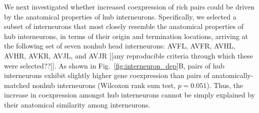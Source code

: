 \documentclass[10pt,letterpaper]{article}
\begin{document}
{We next investigated whether increased coexpression of rich pairs could be driven by the anatomical properties of hub interneurons.
Specifically, we selected a subset of interneurons that most closely resemble the anatomical properties of hub interneurons, in terms of their origin and termination locations, arriving at the following set of seven nonhub head interneurons: AVFL, AVFR, AVHL, AVHR, AVKR, AVJL, and AVJR [[any reproducible criteria through which these were selected??]].
As shown in Fig.~\ref{fig:interneuron_dep}B, pairs of hub interneurons exhibit slightly higher gene coexpression than pairs of anatomically-matched nonhub interneurons (Wilcoxon rank sum test, $p = 0.051$).
Thus, the increase in coexpression amongst hub interneurons cannot be simply explained by their anatomical similarity among interneurons.



}
\end{document}
